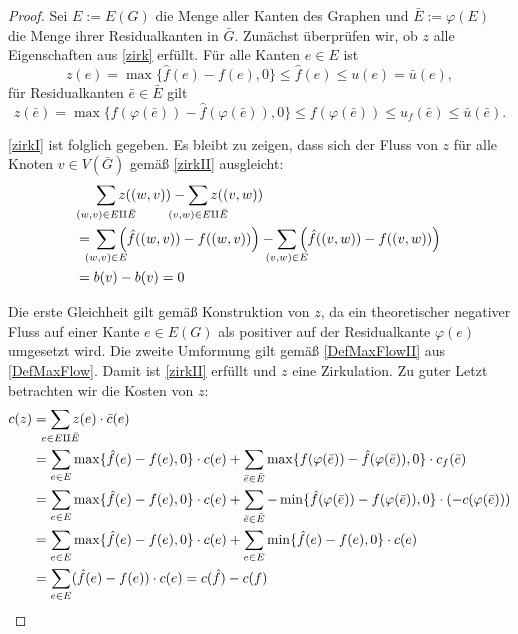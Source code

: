 \begin{proof}Sei $E:=E(G)$ die Menge aller Kanten des Graphen und $\bar{E}:=\varphi(E)$ die Menge ihrer Residualkanten in $\bar{G}$. Zunächst überprüfen wir, ob $z$ alle Eigenschaften aus \cref{zirk} erfüllt. Für alle Kanten $e\in E$ ist
\begin{equation*}z(e)=\max\{\hat{f}(e)-f(e),0\}\leq\hat{f}(e)\leq u(e)=\bar{u}(e),\end{equation*}
für Residualkanten $\bar{e}\in \bar{E}$ gilt
\begin{equation*}z(\bar{e})=\max\{f(\varphi(\bar{e}))-\hat{f}(\varphi(\bar{e})),0\}\leq f(\varphi(\bar{e}))\leq u_f(\bar{e})\leq \bar{u}(\bar{e}).\end{equation*}

\cref{zirkI} ist folglich gegeben. Es bleibt zu zeigen, dass sich der Fluss von $z$ für alle Knoten $v\in V(\bar{G})$ gemäß \cref{zirkII} ausgleicht:
\begin{align*}&\sum_{\mathclap{(w,v)\in E\amalg\bar{E}}} z((w,v)) - \sum_{\mathclap{(v,w)\in E\amalg\bar{E}}} z((v,w))\\
={}&\sum_{\mathclap{(w,v)\in E}} \Big(\hat{f}((w,v)) -  f((w,v))\Big) -  \sum_{\mathclap{(v,w)\in E}} \Big(\hat{f}((v,w)) - f((v,w))\Big)\\
={}&b(v)-b(v)=0\end{align*}

Die erste Gleichheit gilt gemäß Konstruktion von $z$, da ein theoretischer negativer Fluss auf einer Kante $e\in E(G)$ als positiver auf der Residualkante $\varphi(e)$ umgesetzt wird. Die zweite Umformung gilt gemäß \cref{DefMaxFlowII} aus \cref{DefMaxFlow}. Damit ist \cref{zirkII} erfüllt und $z$ eine Zirkulation. Zu guter Letzt betrachten wir die Kosten von $z$:
\begin{align*}c(z)&=\sum_{\mathclap{e\in E\amalg\bar{E}}} z(e)\cdot \bar{c}(e)\\
&=\sum_{e\in E}\max\{\hat{f}(e)-f(e),0\}\cdot c(e) + \sum_{\bar{e}\in \bar{E}}\max\{f(\varphi(\bar{e}))-\hat{f}(\varphi(\bar{e})),0\}\cdot c_f(\bar{e})\\
&=\sum_{e\in E}\max\{\hat{f}(e)-f(e),0\}\cdot c(e) + \sum_{\bar{e}\in \bar{E}}-\min\{\hat{f}(\varphi(\bar{e}))-f(\varphi(\bar{e})),0\}\cdot(- c(\varphi(\bar{e})))\\
&=\sum_{e\in E}\max\{\hat{f}(e)-f(e),0\}\cdot c(e) + \sum_{e\in E}\min\{\hat{f}(e)-f(e),0\}\cdot c(e)\\
&=\sum_{e\in E} (\hat{f}(e)-f(e))\cdot c(e) = c(\hat{f})-c(f)\qedhere
\end{align*}\end{proof}

